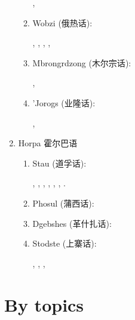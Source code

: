 \documentclass[oldfontcommands,oneside,a4paper,11pt]{article}
\newcommand{\zh}[1]{{\cn #1}}
\newcommand{\langue}[2]{#1}
\begin{document}
\begin{enumerate}
\begin{enumerate}
\citet{huangbf03lavrung}, \citet{huangbf07lavrung}

\item Wobzi (\zh{俄热话}): 

\citet{linxr93jiarong}, \citet{lai13fuyin}, \citet{lai13affixale}, \citet{lai14caus}, \citet{lai14person}
\item Mbrongrdzong (\zh{木尔宗话}): 

\citet{jackson00sidaba}, \citet{jackson05yingao}
\item 'Jorogs (\zh{业隆话}):  

\citet{yin07yelong}, 
\end{enumerate}
\item \langue{Horpa \zh{霍尔巴语}}{Horpa \zh{霍尔巴语}}
\begin{enumerate} 
\item Stau (\zh{道孚话}): 

\citet{hodgson57sifan}, \citet{wang70stau}, \citet{sun83liujiang},  \citet{huangbf91daofu}, \citet{sun13gexi}, \citet{antonov14rtau}, \citet{jacques14rtau}.
\item Phosul (\zh{蒲西话}): 

\citet{jackson00puxi}
\item Dgebshes (\zh{革什扎话}): 

\citet{duoerji98geshizha}
\item Stodste (\zh{上寨话}): 

\citet{jackson00sidaba}, \citet{qu07shangzhai}, \citet{jackson07shangzhai},
\end{enumerate}
\end{enumerate}

\section{\langue{By topics}{Publications classées par sujet étudié}}



\end{document}
